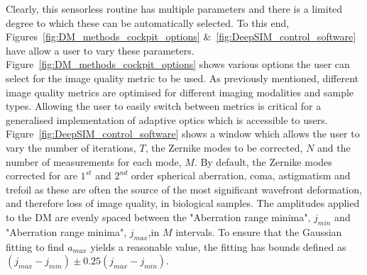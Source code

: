 Clearly, this sensorless routine has multiple parameters and there is a limited degree to which these can be automatically selected. To this end, Figures~\ref{fig:DM_methods_cockpit_options} \&~\ref{fig:DeepSIM_control_software} have allow a user to vary these parameters. Figure~\ref{fig:DM_methods_cockpit_options} shows various options the user can select for the image quality metric to be used. As previously mentioned, different image quality metrics are optimised for different imaging modalities and sample types. Allowing the user to easily switch between metrics is critical for a generalised implementation of adaptive optics which is accessible to users. Figure~\ref{fig:DeepSIM_control_software} shows a window which allows the user to vary the number of iterations, $T$, the Zernike modes to be corrected, $N$ and the number of measurements for each mode, $M$. By default, the Zernike modes corrected for are $1^{st}$ and $2^{nd}$ order spherical aberration, coma, astigmatism and trefoil as these are often the source of the most significant wavefront deformation, and therefore loss of image quality, in biological samples. The amplitudes applied to the DM are evenly spaced between the "Aberration range minima", $j_{min}$ and "Aberration range minima", $j_{max}$,in $M$ intervals. To ensure that the Gaussian fitting to find $a_{max}$ yields a reasonable value, the fitting has bounds defined as $(j_{max}-j_{min}) \pm 0.25(j_{max}-j_{min})$.